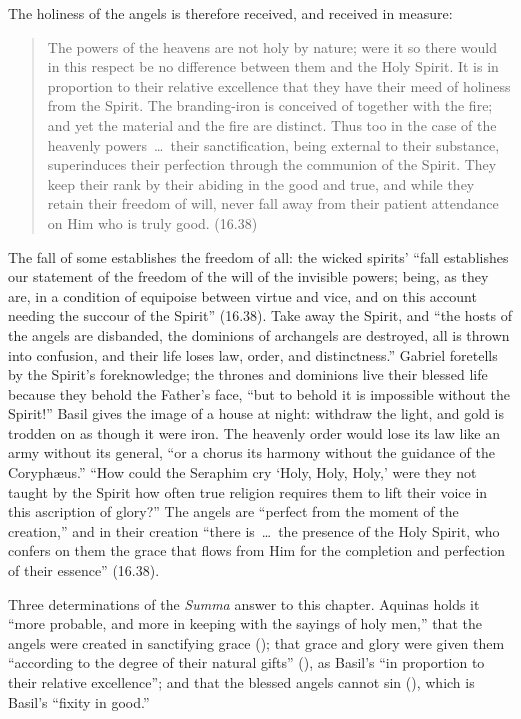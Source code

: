 The holiness of the angels is therefore received, and received in
measure:

\begin{quote}
The powers of the heavens are not holy by nature; were it so there would
in this respect be no difference between them and the Holy Spirit. It is
in proportion to their relative excellence that they have their meed of
holiness from the Spirit. The branding-iron is conceived of together with
the fire; and yet the material and the fire are distinct. Thus too in
the case of the heavenly powers~\dots\ their sanctification, being
external to their substance, superinduces their perfection through the
communion of the Spirit. They keep their rank by their abiding in the
good and true, and while they retain their freedom of will, never fall
away from their patient attendance on Him who is truly good. (16.38)
\end{quote}

\noindent The fall of some establishes the freedom of all: the wicked
spirits' ``fall establishes our statement of the freedom of the will of
the invisible powers; being, as they are, in a condition of equipoise
between virtue and vice, and on this account needing the succour of the
Spirit'' (16.38). Take away the Spirit, and ``the hosts of the angels are
disbanded, the dominions of archangels are destroyed, all is thrown into
confusion, and their life loses law, order, and distinctness.'' Gabriel
foretells by the Spirit's foreknowledge; the thrones and dominions live
their blessed life because they behold the Father's face, ``but to behold
it is impossible without the Spirit!'' Basil gives the image of a house
at night: withdraw the light, and gold is trodden on as though it were
iron. The heavenly order would lose its law like an army without its
general, ``or a chorus its harmony without the guidance of the
Coryph\ae us.'' ``How could the Seraphim cry `Holy, Holy, Holy,' were they
not taught by the Spirit how often true religion requires them to lift
their voice in this ascription of glory?'' The angels are ``perfect from
the moment of the creation,'' and in their creation ``there is~\dots\ the
presence of the Holy Spirit, who confers on them the grace that flows from
Him for the completion and perfection of their essence'' (16.38).

Three determinations of the \emph{Summa} answer to this chapter. Aquinas holds
it ``more probable, and more in keeping with the sayings of holy men,''
that the angels were created in sanctifying grace ();
that grace and glory were given them ``according to the degree of their
natural gifts'' (), as Basil's ``in proportion to their
relative excellence''; and that the blessed angels cannot sin (), which is Basil's ``fixity in good.''

